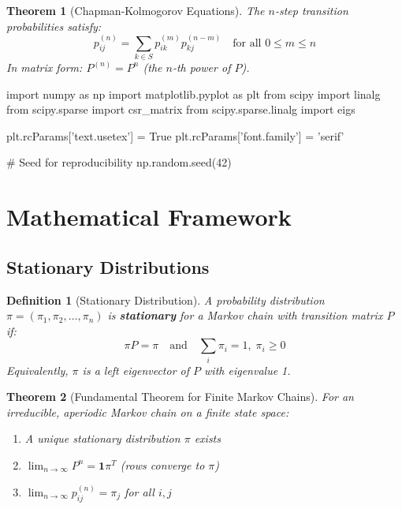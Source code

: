 \documentclass[11pt,a4paper]{article}
\newtheorem{definition}{Definition}[section]
\newtheorem{theorem}{Theorem}[section]
\begin{document}
\begin{theorem}[Chapman-Kolmogorov Equations]
The $n$-step transition probabilities satisfy:
\begin{equation}
p_{ij}^{(n)} = \sum_{k \in S} p_{ik}^{(m)} p_{kj}^{(n-m)} \quad \text{for all } 0 \leq m \leq n
\end{equation}
In matrix form: $P^{(n)} = P^n$ (the $n$-th power of $P$).
\end{theorem}

\begin{pycode}
import numpy as np
import matplotlib.pyplot as plt
from scipy import linalg
from scipy.sparse import csr_matrix
from scipy.sparse.linalg import eigs

plt.rcParams['text.usetex'] = True
plt.rcParams['font.family'] = 'serif'

# Seed for reproducibility
np.random.seed(42)
\end{pycode}

\section{Mathematical Framework}

\subsection{Stationary Distributions}

\begin{definition}[Stationary Distribution]
A probability distribution $\pi = (\pi_1, \pi_2, \ldots, \pi_n)$ is \textbf{stationary} for a Markov chain with transition matrix $P$ if:
\begin{equation}
\pi P = \pi \quad \text{and} \quad \sum_{i} \pi_i = 1, \; \pi_i \geq 0
\end{equation}
Equivalently, $\pi$ is a left eigenvector of $P$ with eigenvalue 1.
\end{definition}

\begin{theorem}[Fundamental Theorem for Finite Markov Chains]
For an irreducible, aperiodic Markov chain on a finite state space:
\begin{enumerate}
\item A unique stationary distribution $\pi$ exists
\item $\lim_{n \to \infty} P^n = \mathbf{1}\pi^T$ (rows converge to $\pi$)
\item $\lim_{n \to \infty} p_{ij}^{(n)} = \pi_j$ for all $i, j$
\end{enumerate}
\end{theorem}
\end{document}
